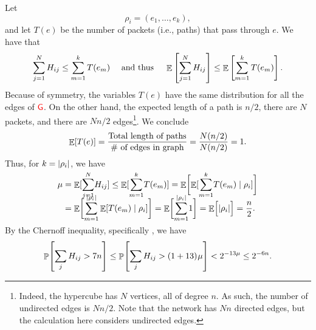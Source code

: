 Let
\begin{equation*}
    \rho_i = (e_1, \ldots, e_k),
\end{equation*}
and let $T(e)$ be the number of packets (i.e., paths) that pass
through $e$. We have that
\begin{equation*}
    \sum_{j=1}^{N} H_{i j}%
    \leq%
    \sum_{m=1}^{k} T(e_m) \quad \text{ and thus }\quad \Ex[]{
       \sum_{j=1}^{N} H_{i j}}%
    \leq%
    \Ex[]{ \sum_{m=1}^{k} T(e_m)}.
\end{equation*}
Because of symmetry, the variables $T(e)$ have the same distribution
for all the edges of ${\textcolor{red}{\mathsf{G}}}$. On the other hand, the expected length
of a path is $n/2$, there are $N$ packets, and there are $N {n}/2$
edges\footnote{Indeed, the hypercube has $N$ vertices, all of degree
   $n$. As such, the number of undirected edges is $N {n}/2$. Note that
   the network has $Nn$ directed edges, but the calculation here considers
   undirected edges.}. We conclude
\begin{equation*}
    \Ex{ T(e)}
    =%
    \frac{\text{Total length of paths}}{\text{\# of edges in graph}}
    =%
    \frac{N (n/2)}{N (n/2)}
    =%
    1.
\end{equation*}
Thus, for $k=\left| {\rho_i} \right|$, we have
\begin{align*}
    \mu
    &=
    \Ex{ \smash{\sum_{j=1}^{N}} H_{i j}}
    \leq
    \Ex{ \smash{\sum_{m=1}^{k}} T(e_m)}
    =
    \Ex{ \biggl. \ExCond{\smash{\sum_{m=1}^{k}} T(e_m)}{\rho_i}} \\
    &=
    \Ex{ \biggl.
       \smash{\sum_{m=1}^{\cardin{\rho_i}}} \ExCond{T(e_m) }{\rho_i } 
    }
    =
    \Ex{ \biggl. \smash{\sum_{m=1}^{\cardin{\rho_i}}} 1 }
    =
    \Ex{ \Bigl. \cardin{\rho_i} }
    =
    \frac{n}{2}.
\end{align*}
By the Chernoff inequality, specifically ,
we have
\begin{equation*}
    \Prob{ \sum_{j} H_{i j} > 7n } \leq \Prob{ \sum_{j} H_{i j} >
       (1+13)\ts \mu } < 2^{-13\mu} \leq 2^{-6n}.
\end{equation*}

